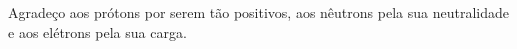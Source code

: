 Agradeço aos prótons por serem tão positivos, aos nêutrons pela sua neutralidade e aos elétrons pela sua carga.


